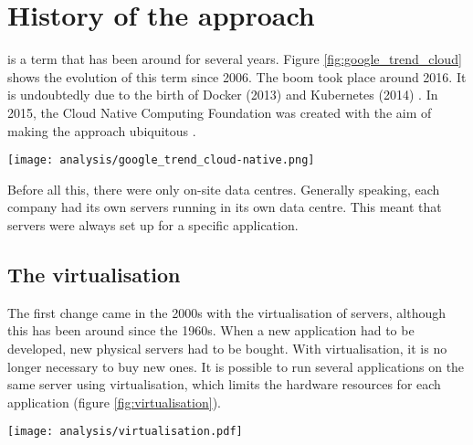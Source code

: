 \section{History of the \texorpdfstring{}{} approach}

 is a term that has been around for several years. Figure \ref{fig:google_trend_cloud} shows the evolution of this term since 2006. The boom took place around 2016. It is undoubtedly due to the birth of Docker (2013) \cite{docker} and Kubernetes (2014) \cite{k8s}. In 2015, the Cloud Native Computing Foundation \cite{cncf} was created with the aim of making the  approach ubiquitous \cite{cncf_charter}.
\begin{center}
    \begingroup
    \texttt{[image: analysis/google\_trend\_cloud-native.png]}
    \label{fig:google_trend_cloud}
    \endgroup
\end{center}
Before all this, there were only on-site data centres. Generally speaking, each company had its own servers running in its own data centre. This meant that servers were always set up for a specific application. \cite{history_cloud_native}

\subsection{The virtualisation}
The first change came in the 2000s with the virtualisation of servers, although this has been around since the 1960s. When a new application had to be developed, new physical servers had to be bought. With virtualisation, it is no longer necessary to buy new ones. It is possible to run several applications on the same server using virtualisation, which limits the hardware resources for each application (figure \ref{fig:virtualisation}). \cite{history_cloud_native}
\begin{center}
    \begingroup
    \texttt{[image: analysis/virtualisation.pdf]}
    \label{fig:virtualisation}
    \endgroup
\end{center}

